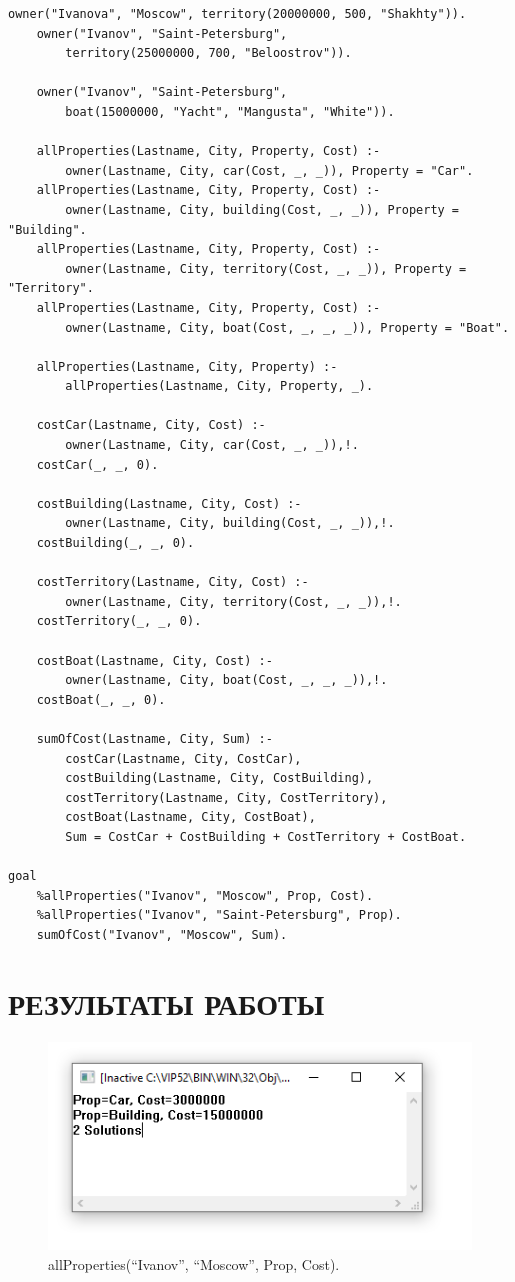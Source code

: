 \begin{lstlisting}[caption=Текст программы]
	owner("Ivanova", "Moscow", territory(20000000, 500, "Shakhty")).
	owner("Ivanov", "Saint-Petersburg",
		territory(25000000, 700, "Beloostrov")).

	owner("Ivanov", "Saint-Petersburg",
		boat(15000000, "Yacht", "Mangusta", "White")).

	allProperties(Lastname, City, Property, Cost) :-
		owner(Lastname, City, car(Cost, _, _)), Property = "Car".
	allProperties(Lastname, City, Property, Cost) :-
		owner(Lastname, City, building(Cost, _, _)), Property = "Building".
	allProperties(Lastname, City, Property, Cost) :-
		owner(Lastname, City, territory(Cost, _, _)), Property = "Territory".
	allProperties(Lastname, City, Property, Cost) :-
		owner(Lastname, City, boat(Cost, _, _, _)), Property = "Boat".

	allProperties(Lastname, City, Property) :-
		allProperties(Lastname, City, Property, _).

	costCar(Lastname, City, Cost) :-
		owner(Lastname, City, car(Cost, _, _)),!.
	costCar(_, _, 0).

	costBuilding(Lastname, City, Cost) :-
		owner(Lastname, City, building(Cost, _, _)),!.
	costBuilding(_, _, 0).

	costTerritory(Lastname, City, Cost) :-
		owner(Lastname, City, territory(Cost, _, _)),!.
	costTerritory(_, _, 0).

	costBoat(Lastname, City, Cost) :-
		owner(Lastname, City, boat(Cost, _, _, _)),!.
	costBoat(_, _, 0).

	sumOfCost(Lastname, City, Sum) :-
		costCar(Lastname, City, CostCar),
		costBuilding(Lastname, City, CostBuilding),
		costTerritory(Lastname, City, CostTerritory),
		costBoat(Lastname, City, CostBoat),
		Sum = CostCar + CostBuilding + CostTerritory + CostBoat.

goal
	%allProperties("Ivanov", "Moscow", Prop, Cost).
	%allProperties("Ivanov", "Saint-Petersburg", Prop).
	sumOfCost("Ivanov", "Moscow", Sum).
\end{lstlisting}

\section{РЕЗУЛЬТАТЫ РАБОТЫ}

\begin{figure}[H]
    \centering
    \includegraphics[scale=1]{img/1.png}
    \caption{allProperties(``Ivanov'', ``Moscow'', Prop, Cost).}
\end{figure}

